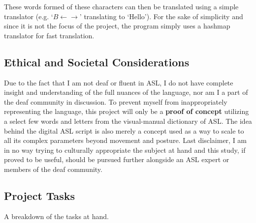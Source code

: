 \documentclass[11pt]{article}
\begin{document}
        These words formed of these characters can then be translated using a simple translator (e.g. `$B \leftarrow \rightarrow$' translating to `Hello'). For the sake of simplicity and since it is not the focus of the project, the program simply uses a hashmap translator for fast translation.


    \subsection{Ethical and Societal Considerations}
        Due to the fact that I am not deaf or fluent in ASL, I do not have complete insight and understanding of the full nuances of the language, nor am I a part of the deaf community in discussion. To prevent myself from inappropriately representing the language, this project will only be a \textbf{proof of concept} utilizing a select few words and letters from the visual-manual dictionary of ASL. The idea behind the digital ASL script is also merely a concept used as a way to scale to all its complex parameters beyond movement and posture. Last disclaimer, I am in no way trying to culturally appropriate the subject at hand and this study, if proved to be useful, should be pursued further alongside an ASL expert or members of the deaf community.

    \subsection{Project Tasks}
        A breakdown of the tasks at hand.
\end{document}
